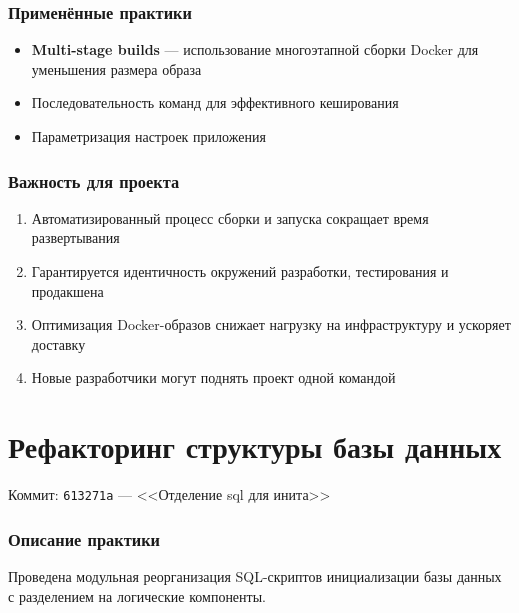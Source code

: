 \documentclass{article}
\begin{document}
\subsubsection{Применённые практики}
\begin{itemize}
\item \textbf{Multi-stage builds} --- использование многоэтапной сборки Docker для уменьшения размера образа
\item Последовательность команд для эффективного кеширования
\item Параметризация настроек приложения
\end{itemize}

\subsubsection{Важность для проекта}
\begin{enumerate}
\item Автоматизированный процесс сборки и запуска сокращает время развертывания
\item Гарантируется идентичность окружений разработки, тестирования и продакшена
\item Оптимизация Docker-образов снижает нагрузку на инфраструктуру и ускоряет доставку
\item Новые разработчики могут поднять проект одной командой
\end{enumerate}


\section{Рефакторинг структуры базы данных}

Коммит: \texttt{613271a} --- <<Отделение sql для инита>>

\subsubsection{Описание практики}
Проведена модульная реорганизация SQL-скриптов инициализации базы данных с разделением на логические компоненты.
\end{document}
